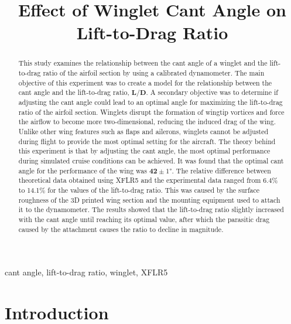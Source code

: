 \documentclass[journal,letterpaper]{IEEEtran}
\begin{document}
\title{Effect of Winglet Cant Angle on Lift-to-Drag Ratio}

\author{
}

\maketitle
\thispagestyle{empty}

\begin{abstract}
This study examines the relationship between the cant angle of a winglet and the lift-to-drag ratio of the airfoil section by using a calibrated dynamometer.
The main objective of this experiment was to create a model for the relationship between the cant angle and the lift-to-drag ratio, $\bm{L/D}$.
A secondary objective was to determine if adjusting the cant angle could lead to an optimal angle for maximizing the lift-to-drag ratio of the airfoil section.
Winglets disrupt the formation of wingtip vortices and force the airflow to become more two-dimensional, reducing the induced drag of the wing.
Unlike other wing features such as flaps and ailerons, winglets cannot be adjusted during flight to provide the most optimal setting for the aircraft.
The theory behind this experiment is that by adjusting the cant angle, the most optimal performance during simulated cruise conditions can be achieved.
It was found that the optimal cant angle for the performance of the wing was $\bm{42 \pm }\ang{1}$.
The relative difference between theoretical data obtained using XFLR5 and the experimental data ranged from 6.4\% to 14.1\% for the values of the lift-to-drag ratio.
This was caused by the surface roughness of the 3D printed wing section and the mounting equipment used to attach it to the dynamometer.
The results showed that the lift-to-drag ratio slightly increased with the cant angle until reaching its optimal value, after which the parasitic drag caused by the attachment causes the ratio to decline in magnitude.
\end{abstract}

\begin{IEEEkeywords}
cant angle, lift-to-drag ratio, winglet, XFLR5
\end{IEEEkeywords}


\section{Introduction}
\end{document}
